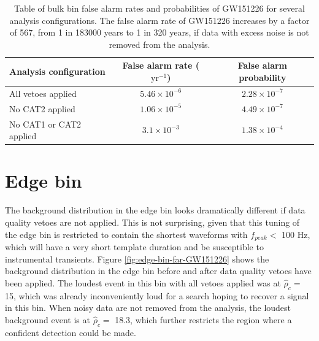 \begin{table}[!ht]%
  \begin{center}
    \begin{tabular}{lcc}
      \hline
      Analysis configuration & False alarm rate ($\mathrm{yr}^{-1}$) & False alarm probability \\ \hline
      All vetoes applied & $5.46\times10^{-6}$  & $2.28\times10^{-7}$ \\
      No CAT2 applied & $1.06\times10^{-5}$ & $4.49\times10^{-7}$ \\
      No CAT1 or CAT2 applied & $3.1\times10^{-3}$ & $1.38\times10^{-4}$ \\ \hline
    \end{tabular}
  \end{center}
  \caption[GW151226 FAR]{Table of bulk bin false alarm rates and probabilities of GW151226 for several analysis %
           configurations. The false alarm rate of GW151226 increases by a factor %
           of 567, from 1 in 183000 years to 1 in 320 years, if data with excess noise %
           is not removed from the analysis.}
  \label{table:GW151226-far}
\end{table}

\section{Edge bin}

The background distribution in the edge bin looks dramatically different if data quality
vetoes are not applied. This is not surprising, given that this tuning of the edge bin
is restricted to contain the shortest waveforms with $f_{peak} <$ 100 Hz, which
will have a very short template duration and be susceptible to instrumental transients.
Figure \ref{fig:edge-bin-far-GW151226} shows the background distribution in the edge bin
before and after data quality vetoes have been applied.
The loudest event in this bin with all vetoes applied was at $\hat{\rho}_{c} =$ 15,
which was already inconveniently loud for a search hoping to recover a signal in this
bin. When noisy data are not removed from the analysis, the loudest background event is at
$\hat{\rho}_{c} =$ 18.3, which further restricts the region where a confident
detection could be made.

